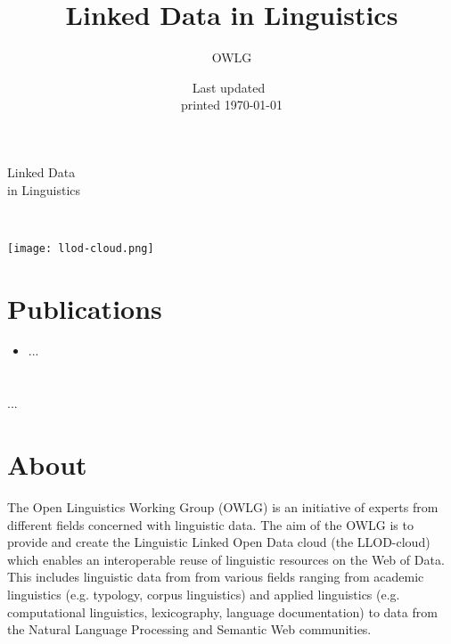 \documentclass[
notumble,
nofoldmark,
]{leaflet}
\title{Linked Data in Linguistics}
\author{%
  OWLG}
\date{Last updated~\docdate\\printed \today}
\begin{document}
%
\thispagestyle{empty}
 
 

\vspace*{12cm}

\hspace*{-6mm}
\parbox{\textwidth}{
\sffamily
\parbox{\textwidth}{\Huge Linked Data \\ in Linguistics}\\ 
}
 

\newpage %
\texttt{[image: llod-cloud.png]}
\section{Publications}
\begin{itemize}
\item ...
\end{itemize} 

\newpage %
\vspace*{12.35cm} 
 \section{} %
 \parbox{\textwidth}{
...
 }

\newpage  %

\section{About}

The Open Linguistics Working Group (OWLG) is an initiative of experts from different fields concerned with linguistic data. 
The aim of the OWLG is to provide and create the Linguistic Linked Open Data cloud (the LLOD-cloud) which enables an interoperable reuse of linguistic resources on the Web of Data.
This includes linguistic data from from various fields ranging from academic linguistics (e.g. typology, corpus linguistics) and applied linguistics (e.g. computational linguistics, lexicography, language documentation) to data from the Natural Language Processing and Semantic Web communities. 
\end{document}
